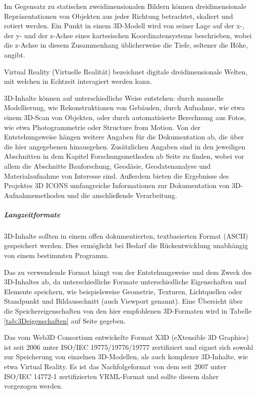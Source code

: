 Im Gegensatz zu statischen zweidimensionalen Bildern können dreidimensionale Repräsentationen von Objekten aus jeder Richtung betrachtet, skaliert und rotiert werden. Ein Punkt in einem 3D-Modell wird von seiner Lage auf der x-, der y- und der z-Achse eines kartesischen Koordinatensystems beschrieben, wobei die z-Achse in diesem Zusammenhang üblicherweise die Tiefe, seltener die Höhe, angibt.

Virtual Reality (Virtuelle Realität) bezeichnet digitale dreidimensionale Welten, mit welchen in Echtzeit interagiert werden kann.

3D-Inhalte können auf unterschiedliche Weise entstehen: durch manuelle Modellierung, wie Rekonstruktionen von Gebäuden, durch Aufnahme, wie etwa einem 3D-Scan von Objekten, oder durch automatisierte Berechnung aus Fotos, wie etwa Photogrammetrie oder Structure from Motion. Von der Entstehungsweise hängen weitere Angaben für die Dokumentation ab, die über die hier angegebenen hinausgehen. Zusätzlichen Angaben sind in den jeweiligen Abschnitten in dem Kapitel Forschungsmethoden ab Seite \pageref{methoden} zu finden, wobei vor allem die Abschnitte Bauforschung, Geodäsie, Geodatenanalyse und Materialaufnahme von Interesse sind. Außerdem bieten die Ergebnisse des Projektes 3D ICONS umfangreiche Informationen zur Dokumentation von 3D-Aufnahmemethoden und die anschließende Verarbeitung. 

\subparagraph{Langzeitformate} 3D-Inhalte sollten in einem offen dokumentierten, textbasierten Format (ASCII) gespeichert werden. Dies ermöglicht bei Bedarf die Rückentwicklung unabhängig von einem bestimmten Programm.

Das zu verwendende Format hängt von der Entstehungsweise und dem Zweck des 3D-Inhaltes ab, da unterschiedliche Formate unterschiedliche Eigenschaften und Elemente speichern, wie beispielsweise Geometrie, Texturen, Lichtquellen oder Standpunkt und Bildausschnitt (auch Viewport genannt). Eine Übersicht über die Speichereigenschaften von den hier empfohlenen 3D-Formaten wird in Tabelle \ref{tab:3Deigenschaften} auf Seite \pageref{tab:3Deigenschaften} gegeben.

Das vom Web3D Consortium entwickelte Format X3D (eXtensible 3D Graphics) ist seit 2006 unter ISO/IEC 19775/19776/19777 zertifiziert und eignet sich sowohl zur Speicherung von einzelnen 3D-Modellen, als auch komplexer 3D-Inhalte, wie etwa Virtual Reality. Es ist das Nachfolgeformat von dem seit 2007 unter ISO/IEC 14772-1 zertifizierten VRML-Format und sollte diesem daher vorgezogen werden. 
	

